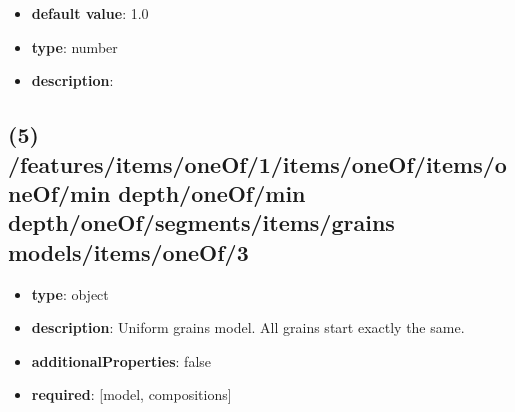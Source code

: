 \begin{itemize}[leftmargin=7em]\item {\bf default value}: 1.0
\item {\bf type}: number
\item {\bf description}: 
\end{itemize}\subsection{(5) /features/items/oneOf/1/items/oneOf/items/oneOf/min depth/oneOf/min depth/oneOf/segments/items/grains models/items/oneOf/3}
\begin{itemize}[leftmargin=5em]\item {\bf type}: object
\item {\bf description}: Uniform grains model. All grains start exactly the same.
\item {\bf additionalProperties}: false
\item {\bf required}: [model, compositions]\end{itemize}

